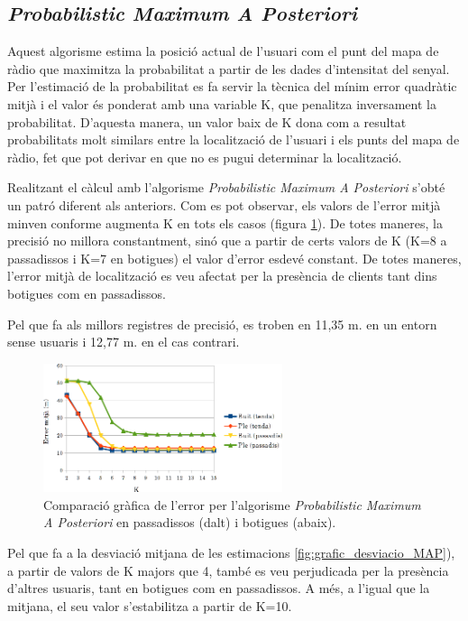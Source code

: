 \subsection{\textit{Probabilistic Maximum A Posteriori}}

Aquest algorisme estima la posició actual de l'usuari com el punt del mapa de ràdio que maximitza la probabilitat a partir de les dades d'intensitat del senyal. Per l'estimació de la probabilitat es fa servir la tècnica del mínim error quadràtic mitjà i el valor és ponderat amb una variable K, que penalitza inversament la probabilitat. D'aquesta manera, un valor baix de K dona com a resultat probabilitats molt similars entre la localització de l'usuari i els punts del mapa de ràdio, fet que pot derivar en que no es pugui determinar la localització.

Realitzant el càlcul amb l'algorisme \textit{Probabilistic Maximum A Posteriori} s'obté un patró diferent als anteriors. Com es pot observar, els valors de l'error mitjà minven conforme augmenta K en tots els casos (figura \ref{fig:grafic_mitja_MAP}). De totes maneres, la precisió no millora constantment, sinó que a partir de certs valors de K (K=8 a passadissos i K=7 en botigues) el valor d'error esdevé constant. De totes maneres, l'error mitjà de localització es veu afectat per la presència de clients tant dins botigues com en passadissos.

Pel que fa als millors registres de precisió, es troben en 11,35 m. en un entorn sense usuaris i 12,77 m. en el cas contrari.

\begin{figure}[ht]
\begin{center}
\includegraphics[width=7cm]{imatges/map_mitja.png}
\caption{Comparació gràfica de l'error per l'algorisme \textit{Probabilistic Maximum A Posteriori} en passadissos (dalt) i botigues (abaix).}
\label{fig:grafic_mitja_MAP}
\end{center}
\end{figure}

Pel que fa a la desviació mitjana de les estimacions \ref{fig:grafic_desviacio_MAP}), a partir de valors de K majors que 4, també es veu perjudicada per la presència d'altres usuaris, tant en botigues com en passadissos. A més, a l'igual que la mitjana, el seu valor s'estabilitza a partir de K=10.

